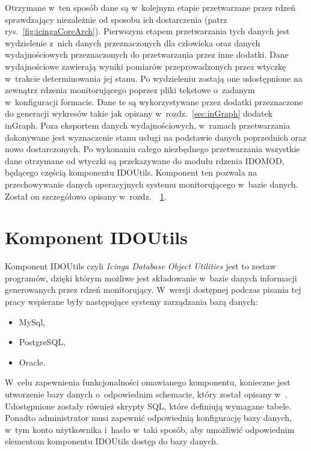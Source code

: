 Otrzymane w~ten sposób dane są w~kolejnym etapie przetwarzane przez
rdzeń sprawdzający niezależnie od sposobu ich dostarczenia (patrz
rys.~\ref{fig:icingaCoreArch}). Pierwszym etapem przetwarzania tych
danych jest wydzielenie z~nich danych przeznaczonych dla człowieka
oraz danych wydajnościowych przeznaczonych do przetwarzania przez inne
dodatki. Dane wydajnościowe zawierają wyniki pomiarów przeprowadzonych
przez wtyczkę w~trakcie determinowania jej stanu. Po wydzieleniu
zostają one udostępnione na zewnątrz rdzenia monitorującego poprzez
pliki tekstowe o~zadanym w~konfiguracji formacie. Dane te są
wykorzystywane przez dodatki przeznaczone do generacji wykresów takie
jak opisany w~rozdz.~\ref{sec:inGraph} dodatek inGraph. Poza eksportem
danych wydajnościowych, w~ramach przetwarzania dokonywane jest
wyznaczenie stanu usługi na podstawie danych poprzednich oraz nowo
dostarczonych. Po wykonaniu całego niezbędnego przetwarzania wszystkie
dane otrzymane od wtyczki są przekazywane do modułu rdzenia IDOMOD,
będącego częścią komponentu IDOUtils. Komponent ten pozwala na
przechowywanie danych operacyjnych systemu monitorującego w~bazie
danych. Został on szczegółowo opisany w~rozdz.~~\ref{sec:IDOUtils}.

\section[Komponent IDOUtils][Komponent IDOUtils]{Komponent IDOUtils}
\label{sec:IDOUtils}

Komponent IDOUtils czyli {\em Icinga Database Object Utilities} jest
to zestaw programów, dzięki którym możliwe jest składowanie w~bazie
danych informacji generowanych przez rdzeń monitorujący. W~wersji
dostępnej podczas pisania tej pracy wspierane były następujące systemy
zarządzania bazą danych:

\begin{itemize}
\item MySql,
\item PostgreSQL,
\item Oracle.
\end{itemize}

W~celu zapewnienia funkcjonalności omawianego komponentu, konieczne
jest utworzenie bazy danych o~odpowiednim schemacie, który został
opisany w~\cite[669-750]{www:IcingaDoc}. Udostępnione zostały również
skrypty SQL, które definiują wymagane tabele. Ponadto administrator
musi zapewnić odpowiednią konfigurację bazy danych, w~tym konto
użytkownika i~hasło w~taki sposób, aby umożliwić odpowiednim
elementom komponentu IDOUtils dostęp do bazy danych.

